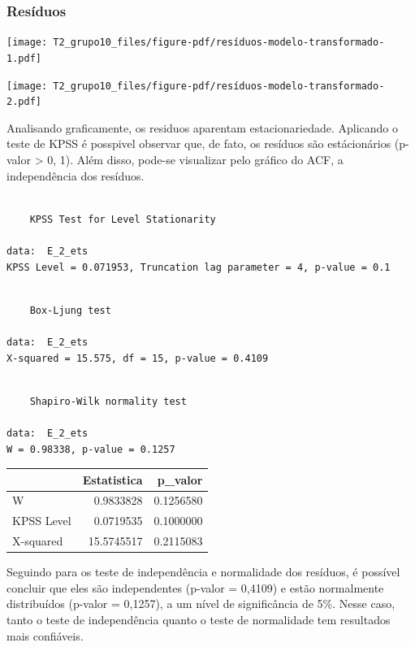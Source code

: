 \documentclass[
  letterpaper,
  DIV=11,
  numbers=noendperiod]{scrartcl}
\begin{document}
\hypertarget{resuxedduos-1}{%
\subsubsection{Resíduos}\label{resuxedduos-1}}

\texttt{[image: T2\_grupo10\_files/figure-pdf/resíduos-modelo-transformado-1.pdf]}

\texttt{[image: T2\_grupo10\_files/figure-pdf/resíduos-modelo-transformado-2.pdf]}

Analisando graficamente, os residuos aparentam estacionariedade.
Aplicando o teste de KPSS é posspivel observar que, de fato, os resíduos
são estácionários (p-valor \textgreater{} 0, 1). Além disso, pode-se
visualizar pelo gráfico do ACF, a independência dos resíduos.

\begin{verbatim}

    KPSS Test for Level Stationarity

data:  E_2_ets
KPSS Level = 0.071953, Truncation lag parameter = 4, p-value = 0.1
\end{verbatim}

\begin{verbatim}

    Box-Ljung test

data:  E_2_ets
X-squared = 15.575, df = 15, p-value = 0.4109
\end{verbatim}

\begin{verbatim}

    Shapiro-Wilk normality test

data:  E_2_ets
W = 0.98338, p-value = 0.1257
\end{verbatim}

\begin{tabular}{l|r|r}
\hline
  & Estatistica & p\_valor\\
\hline
W & 0.9833828 & 0.1256580\\
\hline
KPSS Level & 0.0719535 & 0.1000000\\
\hline
X-squared & 15.5745517 & 0.2115083\\
\hline
\end{tabular}

Seguindo para os teste de independência e normalidade dos resíduos, é
possível concluir que eles são independentes (p-valor = 0,4109) e estão
normalmente distribuídos (p-valor = 0,1257), a um nível de significância
de 5\%. Nesse caso, tanto o teste de independência quanto o teste de
normalidade tem resultados mais confiáveis.
\end{document}
